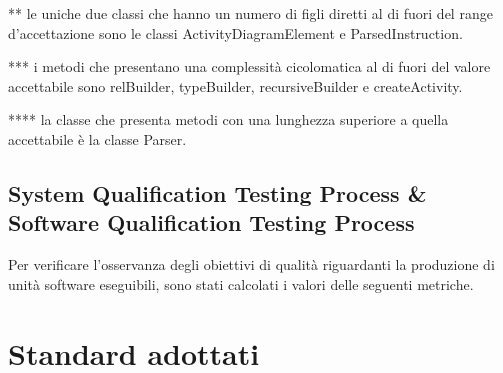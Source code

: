 	** le uniche due classi che hanno un numero di figli diretti al di fuori del range d'accettazione sono le classi ActivityDiagramElement e ParsedInstruction.
	
	*** i metodi che presentano una complessità cicolomatica al di fuori del valore accettabile sono relBuilder, typeBuilder, recursiveBuilder e createActivity.
	
	**** la classe che presenta metodi con una lunghezza superiore a quella accettabile è la classe Parser.
	
	
	\subsection{System Qualification Testing Process \& Software Qualification Testing Process}
		Per verificare l'osservanza degli obiettivi di qualità riguardanti la produzione di unità software eseguibili, sono stati calcolati i valori delle seguenti metriche.
		




\section{Standard adottati}
